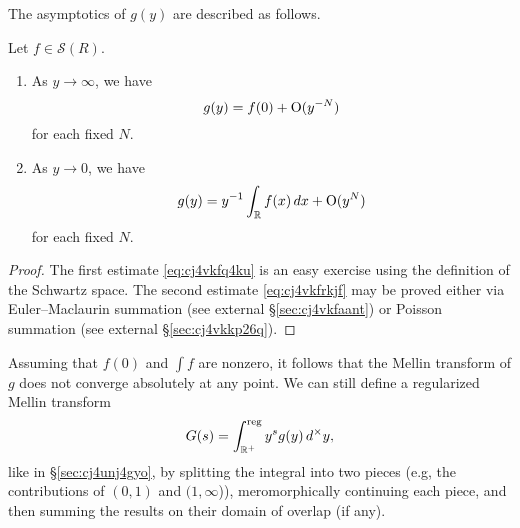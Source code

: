 \documentclass[reqno]{amsart}  \numberwithin{theorem}{section} \numberwithin{equation}{section}
\begin{document}
The asymptotics of $g(y)$ are described as follows.
\begin{lemma}
  Let $f \in \mathcal{S}(R)$.
  \begin{enumerate}
\item 
  As $y \rightarrow \infty$, we have
  \begin{equation}\label{eq:cj4vkfq4ku}
g(y) = f(0) + \operatorname{O}(y^{-N})
  \end{equation}
  for each fixed $N$.
\item As $y \rightarrow 0$, we have
  \begin{equation}\label{eq:cj4vkfrkjf}
g(y) = y^{-1} \int_{\mathbb{R} } f(x) \, d x  + \operatorname{O} (y^{N})
  \end{equation}
  for each fixed $N$.
\end{enumerate}
\end{lemma}
\begin{proof}
The first estimate \eqref{eq:cj4vkfq4ku} is an easy exercise using the definition of the Schwartz space.  The second estimate \eqref{eq:cj4vkfrkjf} may be proved either via Euler--Maclaurin summation (see external \S\ref{sec:cj4vkfaant}) or Poisson summation (see external \S\ref{sec:cj4vkkp26q}).
\end{proof}

Assuming that $f(0)$ and $\int f$ are nonzero, it follows that the Mellin transform of $g$ does not converge absolutely at any point.  We can still define a regularized Mellin transform
\begin{equation*}
G(s) = \int_{\mathbb{R}^+ }^{\operatorname{reg}} y^s g (y) \,d^\times y,
\end{equation*}
like in \S\ref{sec:cj4unj4gyo}, by splitting the integral into two pieces (e.g, the contributions of $(0,1)$ and $(1,\infty$)), meromorphically continuing each piece, and then summing the results on their domain of overlap (if any).
\end{document}
